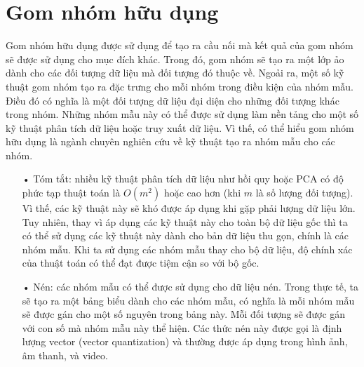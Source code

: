 \section{Gom nhóm hữu dụng}
Gom nhóm hữu dụng được sử dụng để tạo ra cầu nối mà kết quả của gom nhóm sẽ được sử dụng cho mục đích khác.
Trong đó, gom nhóm sẽ tạo ra một lớp ảo dành cho các đối tượng dữ liệu mà đối tượng đó thuộc về.
Ngoải ra, một số kỹ thuật gom nhóm tạo ra đặc trưng cho mỗi nhóm trong điều kiện của nhóm mẫu.
Điều đó có nghĩa là một đối tượng dữ liệu đại diện cho những đối tượng khác trong nhóm.
Những nhóm mẫu này có thể được sử dụng làm nền tảng cho một số kỹ thuật phân tích dữ liệu hoặc truy xuất dữ liệu.
Vì thế, có thể hiểu gom nhóm hữu dụng là ngành chuyên nghiên cứu về kỹ thuật tạo ra nhóm mẫu cho các nhóm.
\begin{enumerate}
\item[•]Tóm tắt: nhiều kỹ thuật phân tích dữ liệu như hồi quy hoặc PCA có độ phức tạp thuật toán là $O(m^2)$ hoặc cao hơn (khi $m$ là số lượng đối tượng).
Vì thế, các kỹ thuật này sẽ khó được áp dụng khi gặp phải lượng dữ liệu lớn.
Tuy nhiên, thay vì áp dụng các kỹ thuật này cho toàn bộ dữ liệu gốc thì ta có thể sử dụng các kỹ thuật này dành cho bản dữ liệu thu gọn, chính là các nhóm mẫu.
Khi ta sử dụng các nhóm mẫu thay cho bộ dữ liệu, độ chính xác của thuật toán có thể đạt được tiệm cận so với bộ gốc. 
\item[•]Nén: các nhóm mẫu có thể được sử dụng cho dữ liệu nén.
Trong thực tế, ta sẽ tạo ra một bảng biểu dành cho các nhóm mẫu, có nghĩa là mỗi nhóm mẫu sẽ được gán cho một số nguyên trong bảng này.
Mỗi đối tượng sẽ được gán với con số mà nhóm mẫu này thể hiện.
Các thức nén này được gọi là định lượng vector (vector quantization) và thường được áp dụng trong hình ảnh, âm thanh, và video.

\end{enumerate}


